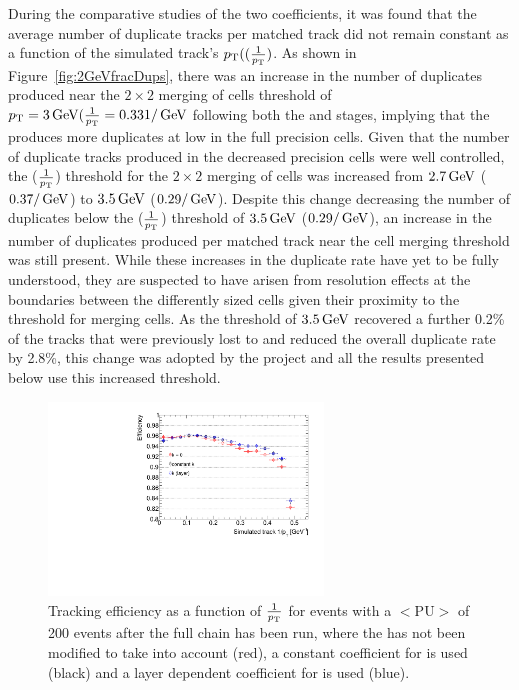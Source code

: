 During the comparative studies of the two \MS coefficients, it was found that the average number of duplicate tracks per matched track did not remain constant as a function of the simulated track's $p_{\mathrm{T}} ((\frac{1}{p_{\mathrm{T}}} )$.
As shown in Figure~\ref{fig:2GeVfracDups}, there was an increase in the number of duplicates produced near the $2 \times 2$ merging of \HT cells threshold of  $p_{\mathrm{T}} = 3\,\text{Ge\hspace{-.08em}V} (\frac{1}{p_{\mathrm{T}}} = 0.33 1/\,\text{Ge\hspace{-.08em}V}$ following both the \HT and \DR stages, implying that the \HT produces more duplicates at low \pT in the full precision cells.
Given that the number of duplicate tracks produced in the decreased precision \HT cells were well controlled, the \pT ($\frac{1}{p_{\mathrm{T}}}$) threshold for the $2 \times 2$ merging of \HT cells was increased from $2.7\,\text{Ge\hspace{-.08em}V}$ ($0.37/\,\text{Ge\hspace{-.08em}V}$) to $3.5\,\text{Ge\hspace{-.08em}V}$ ($0.29/\,\text{Ge\hspace{-.08em}V}$).
Despite this change decreasing the number of duplicates below the \pt ($\frac{1}{p_{\mathrm{T}}}$) threshold of $3.5\,\text{Ge\hspace{-.08em}V}$ ($0.29/\,\text{Ge\hspace{-.08em}V}$), an increase in the number of duplicates produced per matched track near the \HT cell merging threshold was still present.
While these increases in the duplicate rate have yet to be fully understood, they are suspected to have arisen from resolution effects at the boundaries between the differently sized \HT cells given their proximity to the \pT threshold for merging \HT cells.
As the \pT threshold of $3.5\,\text{Ge\hspace{-.08em}V}$ recovered a further 0.2\% of the tracks that were previously lost to \MS and reduced the overall duplicate rate by 2.8\%, this change was adopted by the project and all the results presented below use this increased threshold. 

\begin{figure}[htb]
\centering
\includegraphics[width=0.65\textwidth]{figs/tk-upgrade/results-lowPtTracking/kfTrackingEffVsInvPtTiltedGeometry_5000.pdf}
\caption{Tracking efficiency as a function of $\frac{1}{p_{\mathrm{T}}}$ for \ttbar events with a $<\textrm{PU}>$ of 200 events after the full chain has been run, where the \KF has not been modified to take \MS into account (red), a constant coefficient for \MS is used (black) and a layer dependent coefficient for \MS is used (blue).
}
\label{fig:2GeVTiltEff}	
\end{figure}

